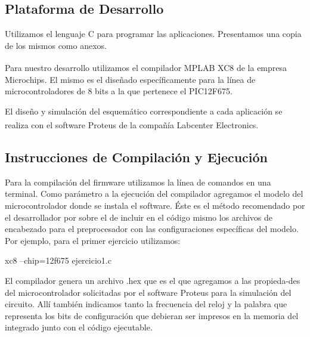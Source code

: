 \documentclass[a4paper]{article}
\let\originalcite\cite
\renewcommand{\cite}[2][]{\textsuperscript{\originalcite{#2}}}
\begin{document}
\subsection{Plataforma de Desarrollo}

Utilizamos el lenguaje C para programar las aplicaciones. Presentamos
una copia de los mismos como anexos.

Para nuestro desarrollo utilizamos el compilador MPLAB 
XC8\cite{bib:compilador} de la empresa Microchips. El mismo es el 
diseñado específicamente para la línea de microcontroladores de 8 bits
a la que pertenece el PIC12F675.

El diseño y simulación del esquemático correspondiente a cada 
aplicación se realiza con el software Proteus\cite{bib:simulador} de 
la compañía Labcenter Electronics.

\subsection{Instrucciones de Compilación y Ejecución}

Para la compilación del firmware utilizamos la línea de comandos en 
una terminal. Como parámetro a la ejecución del compilador agregamos
el modelo del microcontrolador donde se instala el software. Éste es 
el método recomendado por el desarrollador por sobre el de incluir en 
el código mismo los archivos de encabezado para el preprocesador con 
las configuraciones específicas del modelo. Por ejemplo, para el 
primer ejercicio utilizamos:

\begin{center}\ttfamily 
	xc8 --chip=12f675 ejercicio1.c
\end{center}

El compilador genera un archivo {\ttfamily .hex} que es el que
agregamos a las propieda-des del microcontrolador solicitadas 
por el software Proteus para la simulación del circuito. Allí también 
indicamos tanto la frecuencia del reloj y la palabra que representa 
los bits de configuración que debieran ser impresos en la memoria del
integrado junto con el código ejecutable. 
\end{document}
